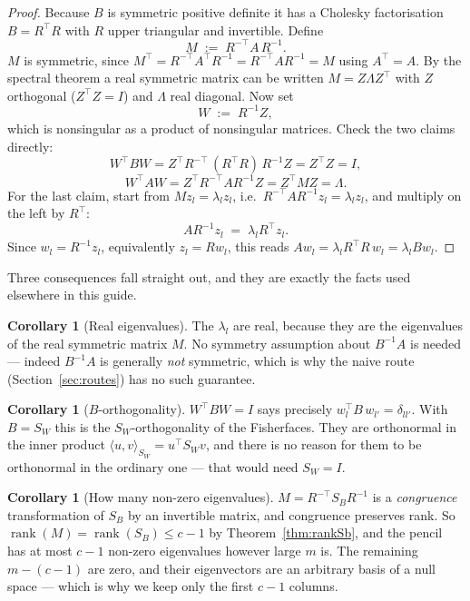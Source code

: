 \documentclass[11pt]{article}
\theoremstyle{definition}
\newtheorem{corollary}[theorem]{Corollary}
\theoremstyle{remark}
\newcommand{\Sw}{S_W}
\newcommand{\Sb}{S_B}
\newcommand{\rank}{\operatorname{rank}}
\begin{document}
\begin{proof}
Because $B$ is symmetric positive definite it has a Cholesky factorisation
$B = R^{\!\top}R$ with $R$ upper triangular and invertible. Define
\[
  M \;:=\; R^{-\top} A\, R^{-1}.
\]
$M$ is symmetric, since
$M^{\!\top} = R^{-\top}A^{\!\top}R^{-1} = R^{-\top}AR^{-1} = M$ using $A^{\!\top}=A$.
By the spectral theorem a real symmetric matrix can be written $M = Z\Lambda Z^{\!\top}$
with $Z$ orthogonal ($Z^{\!\top}Z=I$) and $\Lambda$ real diagonal. Now set
\[
  W \;:=\; R^{-1}Z ,
\]
which is nonsingular as a product of nonsingular matrices. Check the two claims
directly:
\[
  W^{\!\top} B W = Z^{\!\top}R^{-\top}\,(R^{\!\top}R)\,R^{-1}Z = Z^{\!\top}Z = I,
\]
\[
  W^{\!\top} A W = Z^{\!\top}R^{-\top} A R^{-1} Z = Z^{\!\top} M Z = \Lambda .
\]
For the last claim, start from $Mz_l = \lambda_l z_l$, i.e.\
$R^{-\top}AR^{-1}z_l = \lambda_l z_l$, and multiply on the left by $R^{\!\top}$:
\[
  A R^{-1} z_l \;=\; \lambda_l R^{\!\top} z_l .
\]
Since $w_l = R^{-1}z_l$, equivalently $z_l = Rw_l$, this reads
$A w_l = \lambda_l R^{\!\top}R\, w_l = \lambda_l B w_l$.
\end{proof}

Three consequences fall straight out, and they are exactly the facts used
elsewhere in this guide.

\begin{corollary}[Real eigenvalues]
The $\lambda_l$ are real, because they are the eigenvalues of the real symmetric
matrix $M$. No symmetry assumption about $B^{-1}A$ is needed --- indeed $B^{-1}A$
is generally \emph{not} symmetric, which is why the naive route
(Section~\ref{sec:routes}) has no such guarantee.
\end{corollary}

\begin{corollary}[$B$-orthogonality]
$W^{\!\top}BW = I$ says precisely $w_l^{\!\top}B\,w_{l'} = \delta_{ll'}$. With
$B=\Sw$ this is the $\Sw$-orthogonality of the Fisherfaces. They are orthonormal
in the inner product $\langle u,v\rangle_{\Sw} = u^{\!\top}\Sw v$, and there is no
reason for them to be orthonormal in the ordinary one --- that would need
$\Sw = I$.
\end{corollary}

\begin{corollary}[How many non-zero eigenvalues]
$M = R^{-\top}\Sb R^{-1}$ is a \emph{congruence} transformation of $\Sb$ by an
invertible matrix, and congruence preserves rank. So
$\rank(M) = \rank(\Sb) \le c-1$ by Theorem~\ref{thm:rankSb}, and the pencil has at
most $c-1$ non-zero eigenvalues however large $m$ is. The remaining $m-(c-1)$ are
zero, and their eigenvectors are an arbitrary basis of a null space --- which is
why we keep only the first $c-1$ columns.
\end{corollary}
\end{document}
